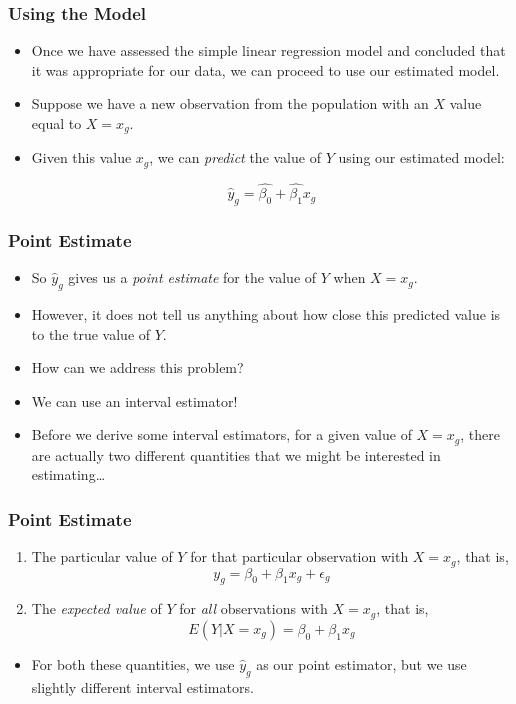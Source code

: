 \documentclass[12pt]{beamer}
\begin{document}
\begin{frame}
	\frametitle{Using the Model}
	
	\begin{itemize}[label={\color{blue}$\blacktriangleright$}]
		\item Once we have assessed the simple linear regression model and concluded that it was appropriate for our data, we can proceed to use our estimated model.
		
		\item Suppose we have a new observation from the population with an $X$ value equal to $X = x_g$.
		
		\item Given this value $x_g$, we can \emph{predict} the value of $Y$ using our estimated model:
		
		\[
		\hat{y}_g = \hat{\beta_0} + \hat{\beta_1}x_g
		\]
	\end{itemize}
\end{frame}
\begin{frame}
	\frametitle{Point Estimate}
	
	\begin{itemize}[label={\color{blue}$\blacktriangleright$}]
		\item So $\hat{y}_g$ gives us a \emph{point estimate} for the value of $Y$ when $X = x_g$.
		
		\item However, it does not tell us anything about how close this predicted value is to the true value of $Y$.
		
		\item How can we address this problem?
		
		\item We can use an interval estimator!
		
		\item Before we derive some interval estimators, for a given value of $X = x_g$, there are actually two different quantities that we might be interested in estimating\ldots
	\end{itemize}
\end{frame}
\begin{frame}
	\frametitle{Point Estimate}
	
	\begin{enumerate}[label=\textcolor{blue}{\arabic*.}]
		\item The particular value of $Y$ for that particular observation with $X = x_g$, that is,
		\[
		y_g = \beta_0 + \beta_1x_g + \epsilon_g
		\]
		
		\item The \emph{expected value} of $Y$ for \emph{all} observations with $X = x_g$, that is,
		\[
		E(Y|X = x_g) = \beta_0 + \beta_1x_g
		\]
	\end{enumerate}
	
	\begin{itemize}[label={\color{blue}$\blacktriangleright$}]
		\item For both these quantities, we use $\hat{y}_g$ as our point estimator, but we use slightly different interval estimators.
	\end{itemize}
\end{frame}
\end{document}
